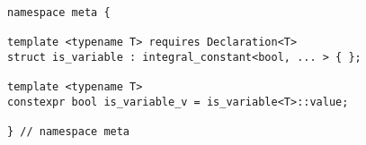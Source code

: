 
\begin{verbatim}
namespace meta {

template <typename T> requires Declaration<T>
struct is_variable : integral_constant<bool, ... > { };

template <typename T>
constexpr bool is_variable_v = is_variable<T>::value;

} // namespace meta
\end{verbatim}
